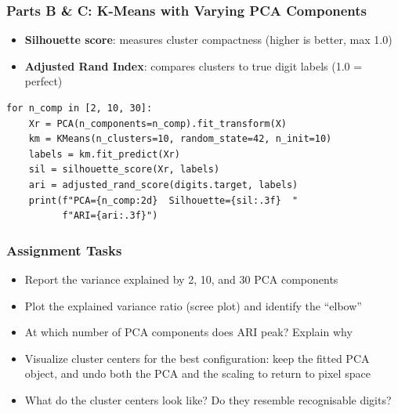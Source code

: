 \begin{frame}[fragile]\frametitle{Parts B \& C: K-Means with Varying PCA Components}
\begin{itemize}
\item \textbf{Silhouette score}: measures cluster compactness (higher is better, max 1.0)
\item \textbf{Adjusted Rand Index}: compares clusters to true digit labels (1.0 = perfect)
\end{itemize}
\begin{lstlisting}
for n_comp in [2, 10, 30]:
    Xr = PCA(n_components=n_comp).fit_transform(X)
    km = KMeans(n_clusters=10, random_state=42, n_init=10)
    labels = km.fit_predict(Xr)
    sil = silhouette_score(Xr, labels)
    ari = adjusted_rand_score(digits.target, labels)
    print(f"PCA={n_comp:2d}  Silhouette={sil:.3f}  "
          f"ARI={ari:.3f}")
\end{lstlisting}
\end{frame}

\begin{frame}[fragile]\frametitle{Assignment Tasks}
\begin{itemize}
\item Report the variance explained by 2, 10, and 30 PCA components
\item Plot the explained variance ratio (scree plot) and identify the ``elbow''
\item At which number of PCA components does ARI peak? Explain why
\item Visualize cluster centers for the best configuration: keep the fitted PCA object, and undo both the PCA and the scaling to return to pixel space
\item What do the cluster centers look like? Do they resemble recognisable digits?
\end{itemize}
\end{frame}
